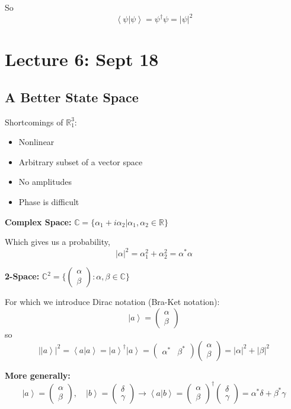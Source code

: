 \documentclass[12pt]{article}
\newcommand{\R}{\mathbb{R}}
\newcommand{\brak}[1]{\left\langle #1 \right\rangle}
\newcommand{\C}{\mathbb{C}}
\newcommand{\ket}[1]{\left\vert #1 \right\rangle}
\begin{document}
So 
\[\brak{\psi | \psi} = \psi^\dagger \psi = |\psi|^2\]

\section*{Lecture 6: Sept 18}
\subsection*{A Better State Space}
Shortcomings of $\R_1^3$:
\begin{itemize}
    \item Nonlinear
    \item Arbitrary subset of a vector space
    \item No amplitudes
    \item Phase is difficult
\end{itemize}

\textbf{Complex Space:} $\mathbb{C} = \{\alpha_1 + i\alpha_2 | \alpha_1, \alpha_2 \in \R\}$ 

Which gives us a probability, 
\[|\alpha|^2 = \alpha_1^2 + \alpha_2^2 = \alpha^*\alpha\]

\textbf{2-Space:} $\mathbb{C}^2 = \{\begin{pmatrix}
    \alpha\\
    \beta
\end{pmatrix} : \alpha, \beta \in \C\}$

For which we introduce Dirac notation (Bra-Ket notation):
\[\ket{a} = \begin{pmatrix}
    \alpha\\\beta
\end{pmatrix}\]
so 
\[|\ket{a}|^2 = \brak{a | a} = \ket{a}^\dagger \ket{a} = \begin{pmatrix}
    \alpha^* & \beta^*
\end{pmatrix} \begin{pmatrix}
    \alpha\\
    \beta
\end{pmatrix} = |\alpha|^2 + |\beta|^2\]

\textbf{More generally:} 
\[\ket{a} = \begin{pmatrix}
    \alpha\\ \beta
\end{pmatrix}, \quad \ket{b} = \begin{pmatrix}
    \delta\\ \gamma
\end{pmatrix} \longrightarrow \brak{a | b} = \begin{pmatrix}
    \alpha\\ \beta
\end{pmatrix}^\dagger \begin{pmatrix}
    \delta\\ \gamma
\end{pmatrix} = \alpha^* \delta + \beta^* \gamma \]
\end{document}
